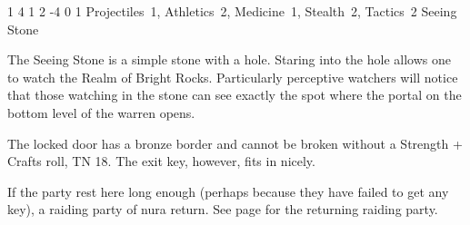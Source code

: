 \begin{multicols}{2}
{	\jelly

}{}

\jelly

\label{grank}
{1}%
{4}%
{{1}%
{2}%
{-4}}%
{0}%
{1}%
{Projectiles~1, Athletics~2, Medicine~1, Stealth~2, Tactics~2%
}%
{Seeing Stone}%
{}


The Seeing Stone is a simple stone with a hole.
Staring into the hole allows one to watch the Realm of Bright Rocks.
Particularly perceptive watchers will notice that those watching in the stone can see exactly the spot where the portal on the bottom level of the warren opens.



The locked door has a bronze border and cannot be broken without a Strength + Crafts roll, TN 18.
The exit key, however, fits in nicely.

If the party rest here long enough (perhaps because they have failed to get any key), a raiding party of nura return.
See page \pageref{raidingParty} for the returning raiding party.


\iftoggle{hardcore}{%

This is where the party exit the lower portion of the warren, and enter the upper part.

\paragraph{If the PCs don't have a key,}
they might try tricking the goblin on the other side, who has a key to let people in and out.
See area 1, \autoref{upper}.

\paragraph{If the PCs examine the door,}
they can see the goblin in the next area by a glimmer of candle-light.

}{

\begin{boxtext}

	As the key turns, the door swings open, and daylight floods in.
	Green trees cover the road down the hill, and in the far distance, chimney-fires from little hamlets wander into the sky.


\end{boxtext}}
\end{multicols}

